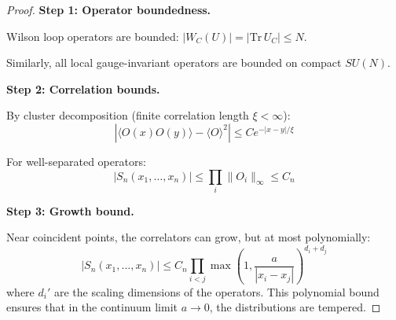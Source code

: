 \begin{proof}
\textbf{Step 1: Operator boundedness.}

Wilson loop operators are bounded: $|W_C(U)| = |\mathrm{Tr}\, U_C| \leq N$.

Similarly, all local gauge-invariant operators are bounded on compact $SU(N)$.

\textbf{Step 2: Correlation bounds.}

By cluster decomposition (finite correlation length $\xi < \infty$):
\begin{equation}
|\langle O(x) O(y) \rangle - \langle O \rangle^2| \leq C e^{-|x-y|/\xi}
\end{equation}

For well-separated operators:
\begin{equation}
|S_n(x_1, \ldots, x_n)| \leq \prod_i \|O_i\|_\infty \leq C_n
\end{equation}

\textbf{Step 3: Growth bound.}

Near coincident points, the correlators can grow, but at most polynomially:
\begin{equation}
|S_n(x_1, \ldots, x_n)| \leq C_n \prod_{i<j} \max\left(1, \frac{a}{|x_i - x_j|}\right)^{d_i + d_j}
\end{equation}
where $d_i'$ are the scaling dimensions of the operators.
This polynomial bound ensures that in the continuum limit $a \to 0$, the distributions are tempered.
\end{proof}






